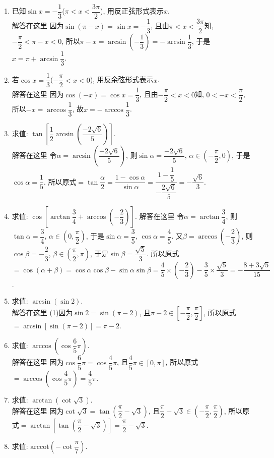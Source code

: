 \documentclass[10pt,a4paper]{article}
\begin{document}
\begin{enumerate}[1.]

\item 已知$\sin x=-\dfrac 13$($\pi <x<\dfrac{3\pi }2$), 用反正弦形式表示$x$.\\
解答在这里  因为$\sin (\pi -x)=\sin x=-\dfrac 13$, 且由$\pi <x<\dfrac{3\pi }2$知, $-\dfrac{\pi }2<\pi -x<0$,
所以$\pi -x=\arcsin (-\dfrac 13)=-\arcsin \dfrac 13$, 于是$x=\pi +\arcsin \dfrac 13$.
\item 若$\cos x=\dfrac 13$($-\dfrac{\pi }2<x<0$), 用反余弦形式表示$x$.\\
解答在这里  因为$\cos (-x)=\cos x=\dfrac 13$, 且由$-\dfrac{\pi }2<x<0$知, $0<-x<\dfrac{\pi }2$,
所以$-x=\arccos \dfrac 13$, 故$x=-\arccos \dfrac 13$.
\item 求值: $\tan [\dfrac 12\arcsin (\dfrac{-2\sqrt 6}5)]$.\\
解答在这里 令$\alpha =\arcsin (\dfrac{-2\sqrt 6}5)$, 则$\sin \alpha =\dfrac{-2\sqrt 6}5$, $\alpha \in (-\dfrac{\pi }2,0)$, 于是$\cos \alpha =\dfrac 15$.
所以原式$=\tan \dfrac\alpha 2=\dfrac{1-\cos \alpha }{\sin \alpha }=\dfrac{1-\dfrac 15}{-\dfrac {2\sqrt 6}5}=-\dfrac{\sqrt 6}3$.
\item 求值: $\cos [\arctan \dfrac 34+\arccos (-\dfrac 23)]$.
解答在这里 令$\alpha =\arctan \dfrac 34$, 则$\tan \alpha =\dfrac 34$, $\alpha \in (0,\dfrac{\pi }2)$, 于是$\sin \alpha =\dfrac 35$, $\cos \alpha =\dfrac 45$. 又$\beta =\arccos (-\dfrac 23)$, 则$\cos \beta =-\dfrac 23$, $\beta \in (\dfrac{\pi }2,\pi)$, 于是$\sin \beta =\dfrac{\sqrt 5}3$.
所以原式$=\cos (\alpha +\beta)=\cos \alpha \cos \beta -\sin \alpha \sin \beta =\dfrac 45\times (-\dfrac 23)-\dfrac 35\times \dfrac{\sqrt 5}3=-\dfrac {8+3\sqrt 5}{15}$.
\item 求值: $\arcsin (\sin 2)$.\\
解答在这里 (1)因为$\sin 2=\sin (\pi -2)$, 且$\pi -2\in [-\dfrac{\pi }2,\dfrac{\pi }2]$,
所以原式$=\arcsin [\sin (\pi -2)]=\pi -2$.
\item 求值: $\arccos (\cos \dfrac 65\pi)$.\\
解答在这里 因为$\cos \dfrac 65\pi =\cos \dfrac 45\pi$, 且$\dfrac 45\pi \in [0,\pi]$, 所以原式$=\arccos (\cos \dfrac 45\pi)=\dfrac 45\pi$.
\item 求值: $\arctan (\cot \sqrt 3)$.\\
解答在这里 因为$\cot \sqrt 3=\tan (\dfrac{\pi }2-\sqrt 3)$, 且$\dfrac{\pi }2-\sqrt 3\in (-\dfrac{\pi }2,\dfrac{\pi }2)$,
所以原式$=\arctan [\tan (\dfrac{\pi }2-\sqrt 3)]=\dfrac{\pi }2-\sqrt 3$.
\item 求值: $\mathrm{arccot} (-\cot \dfrac{\pi }7)$.

\end{enumerate}
\end{document}
